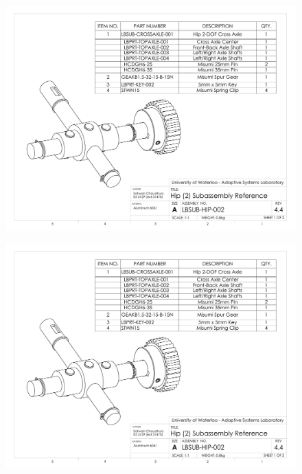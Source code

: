 \begin{figure}[!h]
	\begin{center}
    \includegraphics[scale=0.72,angle=90]{fig/drawings/lbsub-hip-002.pdf}
	\end{center}
\end{figure}

\begin{figure}[!h]
	\begin{center}
    \includegraphics[scale=0.72,angle=90,page=2]{fig/drawings/lbsub-hip-002.pdf}
	\end{center}
\end{figure}


